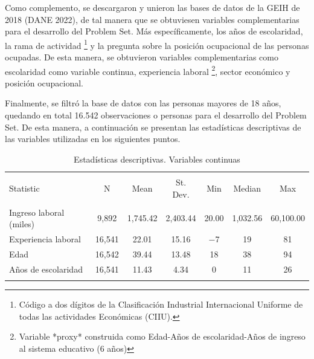 \documentclass[
  11pt,
  letterpaper,
]{article}
\begin{document}
Como complemento, se descargaron y unieron las bases de datos de la GEIH
de 2018 (DANE 2022), de tal manera que se obtuviesen variables
complementarias para el desarrollo del Problem Set. Más específicamente,
los años de escolaridad, la rama de actividad
\footnote{Código a dos dígitos de la Clasificación Industrial Internacional Uniforme de todas las actividades Económicas (CIIU).}
y la pregunta sobre la posición ocupacional de las personas ocupadas. De
esta manera, se obtuvieron variables complementarias como escolaridad
como variable continua, experiencia laboral
\footnote{ Variable *proxy* construida como  Edad-Años de escolaridad-Años de ingreso al sistema educativo (6 años)},
sector económico y posición ocupacional.

Finalmente, se filtró la base de datos con las personas mayores de 18
años, quedando en total 16.542 observaciones o personas para el
desarrollo del Problem Set. De esta manera, a continuación se presentan
las estadísticas descriptivas de las variables utilizadas en los
siguientes puntos.

\begin{table}[H] \centering 
  \caption{Estadísticas descriptivas. Variables continuas} 
  \label{} 
\begin{tabular}{@{\extracolsep{5pt}}lcccccc} 
\\[-1.8ex]\hline 
\hline \\[-1.8ex] 
Statistic & \multicolumn{1}{c}{N} & \multicolumn{1}{c}{Mean} & \multicolumn{1}{c}{St. Dev.} & \multicolumn{1}{c}{Min} & \multicolumn{1}{c}{Median} & \multicolumn{1}{c}{Max} \\ 
\hline \\[-1.8ex] 
Ingreso laboral (miles) & 9,892 & 1,745.42 & 2,403.44 & 20.00 & 1,032.56 & 60,100.00 \\ 
Experiencia laboral & 16,541 & 22.01 & 15.16 & $-$7 & 19 & 81 \\ 
Edad & 16,542 & 39.44 & 13.48 & 18 & 38 & 94 \\ 
Años de escolaridad & 16,541 & 11.43 & 4.34 & 0 & 11 & 26 \\ 
\hline \\[-1.8ex] 
\end{tabular} 
\end{table}
\end{document}
